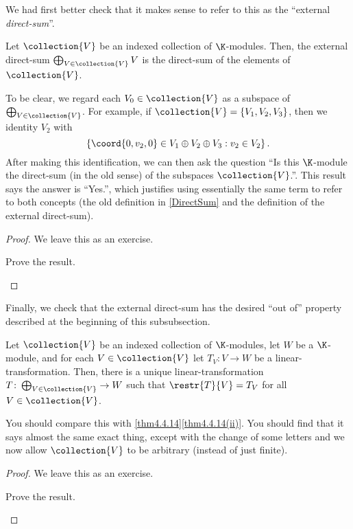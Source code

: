 We had first better check that it makes sense to refer to this as the ``external \emph{direct-sum}''.
\begin{prp}{}{}
	Let $\collection{V}$ be an indexed collection of $\K$-modules.  Then, the external direct-sum $\bigoplus _{V\in \collection{V}}V$ is the direct-sum of the elements of $\collection{V}$.
	\begin{rmk}
		To be clear, we regard each $V_0\in \collection{V}$ as a subspace of $\bigoplus _{V\in \collection{V}}$.  For example, if $\collection{V}=\{ V_1,V_2,V_3\}$, then we identity $V_2$ with
		\begin{equation}
			\left\{ \coord{0,v_2,0}\in V_1\oplus V_2\oplus V_3:v_2\in V_2\right\} .
		\end{equation}
		After making this identification, we can then ask the question ``Is this $\K$-module the direct-sum (in the old sense) of the subspaces $\collection{V}$.''.  This result says the answer is ``Yes.'', which justifies using essentially the same term to refer to both concepts (the old definition in \cref{DirectSum} and the definition of the external direct-sum).
	\end{rmk}
	\begin{proof}
		We leave this as an exercise.
		\begin{exr}[breakable=false]{}{}
			Prove the result.
		\end{exr}
	\end{proof}
\end{prp}
Finally, we check that the external direct-sum has the desired ``out of'' property described at the beginning of this subsubsection.
\begin{prp}{}{}
	Let $\collection{V}$ be an indexed collection of $\K$-modules, let $W$ be a $\K$-module, and for each $V\in \collection{V}$ let $T_V\colon V\rightarrow W$ be a linear-transformation.  Then, there is a unique linear-transformation $T\colon \bigoplus _{V\in \collection{V}}\rightarrow W$ such that $\restr{T}{V}=T_V$ for all $V\in \collection{V}$.
	\begin{rmk}
		You should compare this with \cref{thm4.4.14}\cref{thm4.4.14(ii)}.  You should find that it says almost the same exact thing, except with the change of some letters and we now allow $\collection{V}$ to be arbitrary (instead of just finite).
	\end{rmk}
	\begin{proof}
		We leave this as an exercise.
		\begin{exr}[breakable=false]{}{}
			Prove the result.
		\end{exr}
	\end{proof}
\end{prp}

